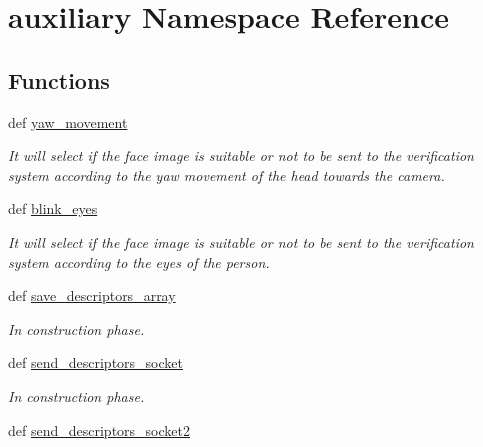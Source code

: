 \hypertarget{namespaceauxiliary}{\section{auxiliary Namespace Reference}
\label{namespaceauxiliary}
}
\subsection*{Functions}
\begin{DoxyCompactItemize}
\item 
def \hyperlink{namespaceauxiliary_af0a4ce60dc31d830c176285588b149ef}{yaw\-\_\-movement}
\begin{DoxyCompactList}\small\item\em It will select if the face image is suitable or not to be sent to the verification system according to the yaw movement of the head towards the camera. \end{DoxyCompactList}\item 
def \hyperlink{namespaceauxiliary_ae22d1d7827aa2906a00e6fac8fc9c2ef}{blink\-\_\-eyes}
\begin{DoxyCompactList}\small\item\em It will select if the face image is suitable or not to be sent to the verification system according to the eyes of the person. \end{DoxyCompactList}\item 
\hypertarget{namespaceauxiliary_a5bb7e810a9ce859f0f4ce787bb8f74cf}{def \hyperlink{namespaceauxiliary_a5bb7e810a9ce859f0f4ce787bb8f74cf}{save\-\_\-descriptors\-\_\-array}}\label{namespaceauxiliary_a5bb7e810a9ce859f0f4ce787bb8f74cf}

\begin{DoxyCompactList}\small\item\em In construction phase. \end{DoxyCompactList}\item 
\hypertarget{namespaceauxiliary_a711c0b5a01a24683b3ba2c6eca1b96e1}{def \hyperlink{namespaceauxiliary_a711c0b5a01a24683b3ba2c6eca1b96e1}{send\-\_\-descriptors\-\_\-socket}}\label{namespaceauxiliary_a711c0b5a01a24683b3ba2c6eca1b96e1}

\begin{DoxyCompactList}\small\item\em In construction phase. \end{DoxyCompactList}\item 
\hypertarget{namespaceauxiliary_a681eebd7d4f0632ca527d000d79fbc5c}{def \hyperlink{namespaceauxiliary_a681eebd7d4f0632ca527d000d79fbc5c}{send\-\_\-descriptors\-\_\-socket2}}\label{namespaceauxiliary_a681eebd7d4f0632ca527d000d79fbc5c}


\end{DoxyCompactItemize}
